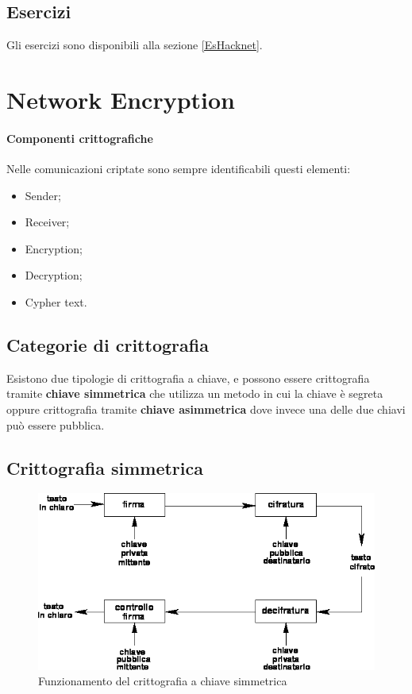 \subsection{Esercizi}

Gli esercizi sono disponibili alla sezione \ref{EsHacknet}.


\section{Network Encryption}

\paragraph*{Componenti crittografiche}
Nelle comunicazioni criptate sono sempre identificabili questi elementi:
\begin{itemize}
\item Sender;
\item Receiver;
\item Encryption;
\item Decryption;
\item Cypher text.
\end{itemize}

\subsection{Categorie di crittografia}

Esistono due tipologie di crittografia a chiave, e possono essere crittografia 
tramite \textbf{chiave simmetrica} che utilizza un metodo in cui la chiave è 
segreta oppure crittografia tramite \textbf{chiave asimmetrica} dove invece una 
delle due chiavi può essere pubblica.

\subsection{Crittografia simmetrica}

\begin{figure}[H]
\centering
\includegraphics[scale=0.4]{res/img/symmetric.png}
\caption{Funzionamento del crittografia a chiave simmetrica}
\label{fig:password:symmetric}
\end{figure}


